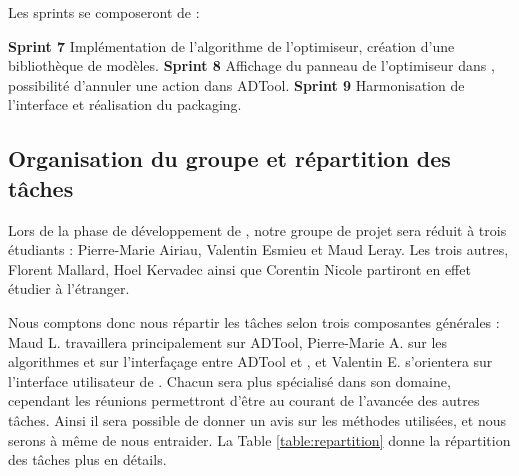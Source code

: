             Les sprints se composeront de :

            \noindent\textbf{Sprint 7} Implémentation de l'algorithme de l'optimiseur, création d'une bibliothèque de modèles.\newline
            \textbf{Sprint 8} Affichage du panneau de l'optimiseur dans \glasir{}, possibilité d'annuler une action dans ADTool.\newline
            \textbf{Sprint 9} Harmonisation de l'interface et réalisation du packaging. \newline



    
    
    \subsection{Organisation du groupe et répartition des tâches}
        Lors de la phase de développement de \glasir{}, notre groupe de projet sera réduit à trois étudiants : Pierre-Marie {\sc Airiau}, Valentin {\sc Esmieu} et Maud {\sc Leray}. Les trois autres, Florent {\sc Mallard}, Hoel {\sc Kervadec} ainsi que Corentin {\sc Nicole} partiront en effet étudier à l'étranger.
        
        Nous comptons donc nous répartir les tâches selon trois composantes générales : Maud L. travaillera principalement sur ADTool, Pierre-Marie A. sur les algorithmes et sur l'interfaçage entre ADTool et \glasir{}, et Valentin E. s'orientera sur l'interface utilisateur de \glasir{}. Chacun sera plus spécialisé dans son domaine, cependant les réunions permettront d'être au courant de l'avancée des autres tâches. Ainsi il sera possible de donner un avis sur les méthodes utilisées, et nous serons à même de nous entraider. La {\sc Table} \ref{table:repartition} donne la répartition des tâches plus en détails.

